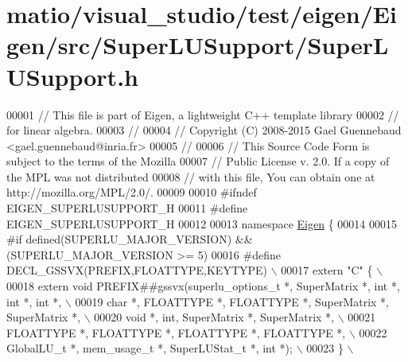 \hypertarget{matio_2visual__studio_2test_2eigen_2_eigen_2src_2_super_l_u_support_2_super_l_u_support_8h_source}{}\section{matio/visual\+\_\+studio/test/eigen/\+Eigen/src/\+Super\+L\+U\+Support/\+Super\+L\+U\+Support.h}
\label{matio_2visual__studio_2test_2eigen_2_eigen_2src_2_super_l_u_support_2_super_l_u_support_8h_source}

\begin{DoxyCode}
00001 \textcolor{comment}{// This file is part of Eigen, a lightweight C++ template library}
00002 \textcolor{comment}{// for linear algebra.}
00003 \textcolor{comment}{//}
00004 \textcolor{comment}{// Copyright (C) 2008-2015 Gael Guennebaud <gael.guennebaud@inria.fr>}
00005 \textcolor{comment}{//}
00006 \textcolor{comment}{// This Source Code Form is subject to the terms of the Mozilla}
00007 \textcolor{comment}{// Public License v. 2.0. If a copy of the MPL was not distributed}
00008 \textcolor{comment}{// with this file, You can obtain one at http://mozilla.org/MPL/2.0/.}
00009 
00010 \textcolor{preprocessor}{#ifndef EIGEN\_SUPERLUSUPPORT\_H}
00011 \textcolor{preprocessor}{#define EIGEN\_SUPERLUSUPPORT\_H}
00012 
00013 \textcolor{keyword}{namespace }\hyperlink{namespace_eigen}{Eigen} \{
00014 
00015 \textcolor{preprocessor}{#if defined(SUPERLU\_MAJOR\_VERSION) && (SUPERLU\_MAJOR\_VERSION >= 5)}
00016 \textcolor{preprocessor}{#define DECL\_GSSVX(PREFIX,FLOATTYPE,KEYTYPE)        \(\backslash\)}
00017 \textcolor{preprocessor}{    extern "C" \{                                                                                          \(\backslash\)}
00018 \textcolor{preprocessor}{      extern void PREFIX##gssvx(superlu\_options\_t *, SuperMatrix *, int *, int *, int *,                  \(\backslash\)}
00019 \textcolor{preprocessor}{                                char *, FLOATTYPE *, FLOATTYPE *, SuperMatrix *, SuperMatrix *,           \(\backslash\)}
00020 \textcolor{preprocessor}{                                void *, int, SuperMatrix *, SuperMatrix *,                                \(\backslash\)}
00021 \textcolor{preprocessor}{                                FLOATTYPE *, FLOATTYPE *, FLOATTYPE *, FLOATTYPE *,                       \(\backslash\)}
00022 \textcolor{preprocessor}{                                GlobalLU\_t *, mem\_usage\_t *, SuperLUStat\_t *, int *);                     \(\backslash\)}
00023 \textcolor{preprocessor}{    \}                                                                                                     \(\backslash\)}

\end{DoxyCode}
